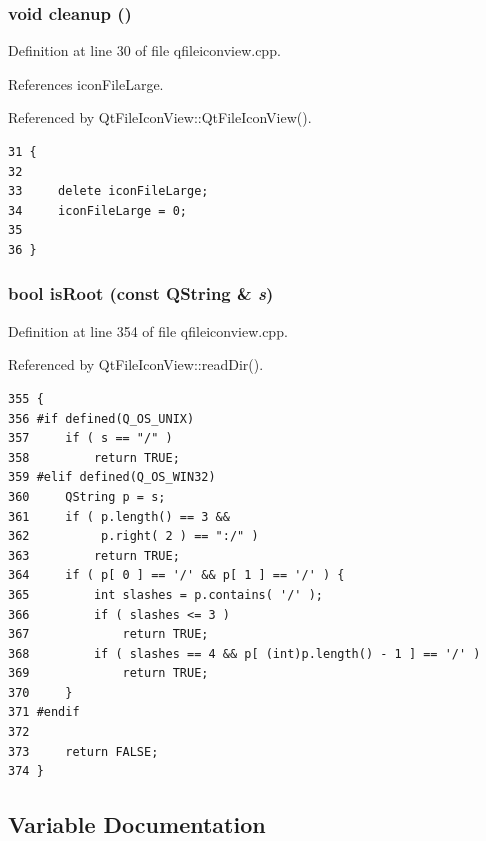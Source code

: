 \subsubsection{\setlength{\rightskip}{0pt plus 5cm}void cleanup ()\hspace{0.3cm}{\tt  [static]}}\label{qfileiconview_8cpp_a2}




Definition at line 30 of file qfileiconview.cpp.

References icon\-File\-Large.

Referenced by Qt\-File\-Icon\-View::Qt\-File\-Icon\-View().



\footnotesize\begin{verbatim}31 {
32     
33     delete iconFileLarge;
34     iconFileLarge = 0;
35     
36 }
\end{verbatim}\normalsize 
{}
\subsubsection{\setlength{\rightskip}{0pt plus 5cm}bool is\-Root (const QString \& {\em s})\hspace{0.3cm}{\tt  [static]}}\label{qfileiconview_8cpp_a4}




Definition at line 354 of file qfileiconview.cpp.

Referenced by Qt\-File\-Icon\-View::read\-Dir().



\footnotesize\begin{verbatim}355 {
356 #if defined(Q_OS_UNIX)
357     if ( s == "/" )
358         return TRUE;
359 #elif defined(Q_OS_WIN32)
360     QString p = s;
361     if ( p.length() == 3 &&
362          p.right( 2 ) == ":/" )
363         return TRUE;
364     if ( p[ 0 ] == '/' && p[ 1 ] == '/' ) {
365         int slashes = p.contains( '/' );
366         if ( slashes <= 3 )
367             return TRUE;
368         if ( slashes == 4 && p[ (int)p.length() - 1 ] == '/' )
369             return TRUE;
370     }
371 #endif
372 
373     return FALSE;
374 }
\end{verbatim}\normalsize 


\subsection{Variable Documentation}

